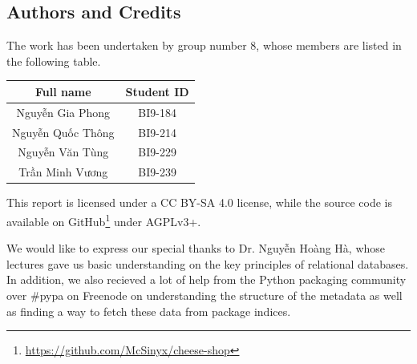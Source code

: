 \documentclass[a4paper,12pt]{article}
\begin{document}
\subsection{Authors and Credits}
The work has been undertaken by group number 8, whose members are listed
in the following table.
\begin{center}
  \begin{tabular}{c c}
    \toprule
    Full name & Student ID\\
    \midrule
    Nguyễn Gia Phong & BI9-184\\
    Nguyễn Quốc Thông & BI9-214\\
    Nguyễn Văn Tùng & BI9-229\\
    Trần Minh Vương & BI9-239\\
    \bottomrule
  \end{tabular}
\end{center}

This report is licensed under a CC BY-SA 4.0 license, while the source code is
available on GitHub\footnote{\url{https://github.com/McSinyx/cheese-shop}}
under AGPLv3+.

We would like to express our special thanks to Dr. Nguyễn Hoàng Hà,
whose lectures gave us basic understanding on the key principles of
relational databases.  In addition, we also recieved a lot of help from
the Python packaging community over \#pypa on Freenode on understanding
the structure of the metadata as well as finding a way to fetch these
data from package indices.

\end{document}
